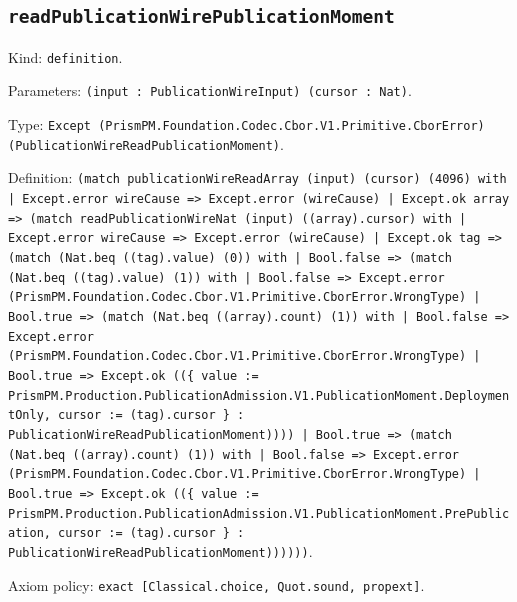 \documentclass[11pt]{article}
\begin{document}
\subsection*{\texttt{readPublicationWirePublicationMoment}}
\noindent Kind: \texttt{definition}.\par
\noindent Parameters: \texttt{(input : PublicationWireInput) (cursor : Nat)}.\par
\noindent Type: \texttt{Except (PrismPM.Foundation.Codec.Cbor.V1.Primitive.CborError) (PublicationWireReadPublicationMoment)}.\par
\noindent Definition: \texttt{(match publicationWireReadArray (input) (cursor) (4096) with | Except.error wireCause => Except.error (wireCause) | Except.ok array => (match readPublicationWireNat (input) ((array).cursor) with | Except.error wireCause => Except.error (wireCause) | Except.ok tag => (match (Nat.beq ((tag).value) (0)) with | Bool.false => (match (Nat.beq ((tag).value) (1)) with | Bool.false => Except.error (PrismPM.Foundation.Codec.Cbor.V1.Primitive.CborError.WrongType) | Bool.true => (match (Nat.beq ((array).count) (1)) with | Bool.false => Except.error (PrismPM.Foundation.Codec.Cbor.V1.Primitive.CborError.WrongType) | Bool.true => Except.ok ((\{ value := PrismPM.Production.PublicationAdmission.V1.PublicationMoment.DeploymentOnly, cursor := (tag).cursor \} : PublicationWireReadPublicationMoment)))) | Bool.true => (match (Nat.beq ((array).count) (1)) with | Bool.false => Except.error (PrismPM.Foundation.Codec.Cbor.V1.Primitive.CborError.WrongType) | Bool.true => Except.ok ((\{ value := PrismPM.Production.PublicationAdmission.V1.PublicationMoment.PrePublication, cursor := (tag).cursor \} : PublicationWireReadPublicationMoment))))))}.\par
\noindent Axiom policy: \texttt{exact [Classical.choice, Quot.sound, propext]}.\par
\end{document}
